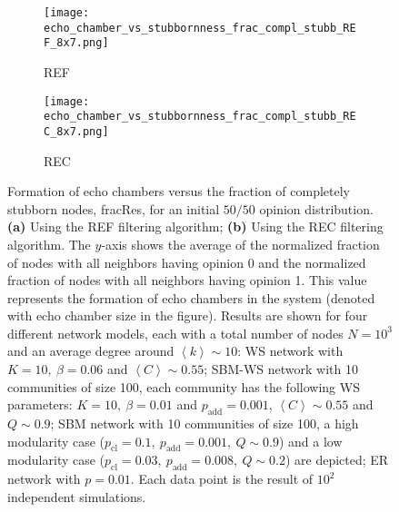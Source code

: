 \documentclass[11 pt , letterpaper , twoside , openright]{book}
\begin{document}
\begin{figure}[H]
  \begin{subfigure}[b]{0.49\textwidth}
  	\texttt{[image: echo\_chamber\_vs\_stubbornness\_frac\_compl\_stubb\_REF\_8x7.png]}
    \caption{REF}
  \end{subfigure}
  \begin{subfigure}[b]{0.49\textwidth}
  	\texttt{[image: echo\_chamber\_vs\_stubbornness\_frac\_compl\_stubb\_REC\_8x7.png]}
    \caption{REC}
    \label{REC_frac_compl_stubb}
  \end{subfigure}
  \captionsetup{format=plain}
  \caption[Formation of echo chambers versus fraction of completely stubborn nodes for the REF and REC filtering algorithms and an initial $50/50$ opinion distribution]{Formation of echo chambers versus the fraction of completely stubborn nodes, fracRes, for an initial $50/50$ opinion distribution. \textbf{(a)} Using the REF filtering algorithm; \textbf{(b)} Using the REC filtering algorithm. The $y$-axis shows the average of the normalized fraction of nodes with all neighbors having opinion 0 and the normalized fraction of nodes with all neighbors having opinion 1. This value represents the formation of echo chambers in the system (denoted with echo chamber size in the figure). Results are shown for four different network models, each with a total number of nodes $N=10^3$ and an average degree around $\left<k\right> \sim 10$: WS network with $K =10,\ \beta = 0.06$ and $\left<C\right> \sim 0.55$; SBM-WS network with 10 communities of size 100, each community has the following WS parameters: $K = 10,\ \beta = 0.01$ and $p_{\text{add}} = 0.001$, $\left<C\right> \sim 0.55$ and $Q \sim 0.9$; SBM network with 10 communities of size 100, a high modularity case ($p_{\text{cl}} = 0.1,\ p_{\text{add}} = 0.001,\ Q \sim 0.9$) and a low modularity case ($p_{\text{cl}} = 0.03,\ p_{\text{add}} = 0.008,\ Q \sim 0.2$) are depicted; ER network with $p= 0.01$. Each data point is the result of $10^2$ independent simulations.}
\label{echo_vs_frac_complStubb_REF-REC}
\end{figure}
\noindent
\end{document}

